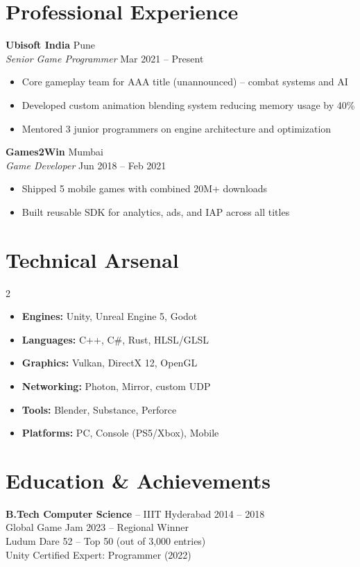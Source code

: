 \documentclass[10pt,letterpaper]{article}
\begin{document}
\section{Professional Experience}
\textbf{Ubisoft India} \hfill Pune\\
\textit{Senior Game Programmer} \hfill Mar 2021 -- Present
\begin{itemize}
\item Core gameplay team for AAA title (unannounced) -- combat systems and AI
\item Developed custom animation blending system reducing memory usage by 40\%
\item Mentored 3 junior programmers on engine architecture and optimization
\end{itemize}

\textbf{Games2Win} \hfill Mumbai\\
\textit{Game Developer} \hfill Jun 2018 -- Feb 2021
\begin{itemize}
\item Shipped 5 mobile games with combined 20M+ downloads
\item Built reusable SDK for analytics, ads, and IAP across all titles
\end{itemize}

\section{Technical Arsenal}
\begin{multicols}{2}
\begin{itemize}[label=\color{gamepurple}]
\item \textbf{Engines:} Unity, Unreal Engine 5, Godot
\item \textbf{Languages:} C++, C\#, Rust, HLSL/GLSL
\item \textbf{Graphics:} Vulkan, DirectX 12, OpenGL
\item \textbf{Networking:} Photon, Mirror, custom UDP
\item \textbf{Tools:} Blender, Substance, Perforce
\item \textbf{Platforms:} PC, Console (PS5/Xbox), Mobile
\end{itemize}
\end{multicols}

\section{Education \& Achievements}
\textbf{B.Tech Computer Science} -- IIIT Hyderabad \hfill 2014 -- 2018\\[3pt]
\hspace{4pt} Global Game Jam 2023 -- Regional Winner\\
\hspace{4pt} Ludum Dare 52 -- Top 50 (out of 3,000 entries)\\
\hspace{4pt} Unity Certified Expert: Programmer (2022)
\end{document}
